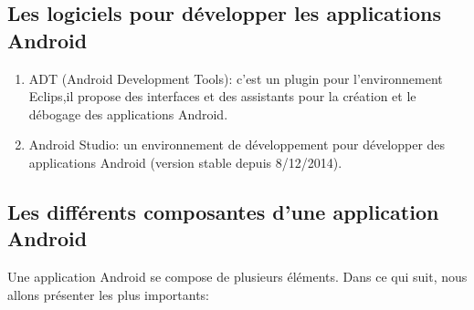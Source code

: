 \documentclass[french,a4,12pt]{report}
\begin{document}
\begin{tcolorbox}[colframe=green!75,rightrule=0.5cm,leftrule=0.5cm,]
	\centering
\subsection{Les logiciels pour développer les applications Android}
\end{tcolorbox}
\begin{enumerate}[label=\textcolor{blue}{$\rhd$}]
	\item { ADT (Android Development Tools):}
	c'est un plugin pour l'environnement Eclips,il propose des interfaces et des assistants pour la création et le débogage des
	applications Android.  
	\item {Android Studio:}
	un environnement de développement pour développer des applications Android (version stable depuis 8/12/2014).
\end{enumerate}
\begin{tcolorbox}[colframe=green!75,rightrule=0.5cm,leftrule=0.5cm,]
	\centering
\subsection{Les différents composantes d'une application Android}
\end{tcolorbox}
Une application Android se compose de plusieurs éléments. Dans ce qui suit, nous allons
présenter les plus importants:
\end{document}
